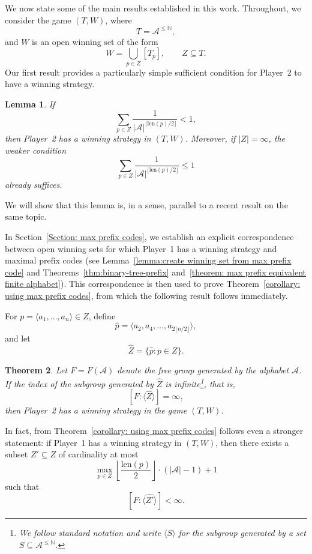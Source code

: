 \documentclass[a4,12pt]{article}%
\newtheorem{theorem}{Theorem}[section]
\newtheorem{lemma}[theorem]{Lemma}
\begin{document}
\medskip

We now state some of the main results established in this work. Throughout, we consider the game $(T,W)$, where
\[
T=\mathcal{A}^{\le \mathbb{N}},
\]
and $W$ is an open winning set of the form
\[
W=\bigcup_{p\in Z}[T_p],
\qquad
Z\subseteq T.
\]
Our first result provides a particularly simple sufficient condition for Player~2 to have a winning strategy.

\begin{lemma} \label{Main result: sum condition}
If
\[
\sum_{p \in Z} \frac{1}{|\mathcal{A}|^{\lfloor \mathrm{len}(p)/2 \rfloor}} < 1,
\]
then Player~2 has a winning strategy in $(T,W)$. Moreover, if $|Z| = \infty$, the weaker condition
\[
\sum_{p \in Z} \frac{1}{|\mathcal{A}|^{\lfloor \mathrm{len}(p)/2 \rfloor}} \leq 1
\]
already suffices.
\end{lemma}

We will show that this lemma is, in a sense, parallel to a recent result on the same topic.

\medskip

In Section~\ref{Section: max prefix codes}, we establish an explicit correspondence between open winning sets for which Player~1 has a winning strategy and maximal prefix codes (see Lemma~\ref{lemma:create winning set from max prefix code} and Theorems~\ref{thm:binary-tree-prefix} and~\ref{theorem: max prefix equivalent finite alphabet}). This correspondence is then used to prove Theorem~\ref{corollary: using max prefix codes}, from which the following result follows immediately.

For $p = \langle a_1, \ldots, a_n \rangle \in Z$, define
\[
\hat{p} = \langle a_2, a_4, \ldots, a_{2\lfloor n/2 \rfloor} \rangle,
\]
and let
\[
\hat{Z} = \{ \hat{p} : p \in Z \}.
\]

\begin{theorem}\label{Main result: index property}
Let $F=F(\mathcal{A})$ denote the free group generated by the alphabet $\mathcal{A}$. If the index of the subgroup generated by $\hat{Z}$ is infinite\footnote{We follow standard notation and write $\langle S\rangle$ for the subgroup generated by a set $S\subseteq \mathcal{A}^{\le \mathbb{N}}$.}, that is,
\[
[F:\langle \hat{Z}\rangle]=\infty,
\]
then Player~2 has a winning strategy in the game $(T,W)$.
\end{theorem}

In fact, from Theorem~\ref{corollary: using max prefix codes} follows even a stronger statement: if Player~1 has a winning strategy in $(T,W)$, then there exists a subset
$Z' \subseteq Z$ of cardinality at most
\[
\max_{p \in Z} \left\lfloor \frac{\mathrm{len}(p)}{2} \right\rfloor \cdot (|\mathcal{A}| - 1) + 1
\]
such that
\[
[F : \langle \hat{Z'} \rangle] < \infty.
\]
\end{document}
